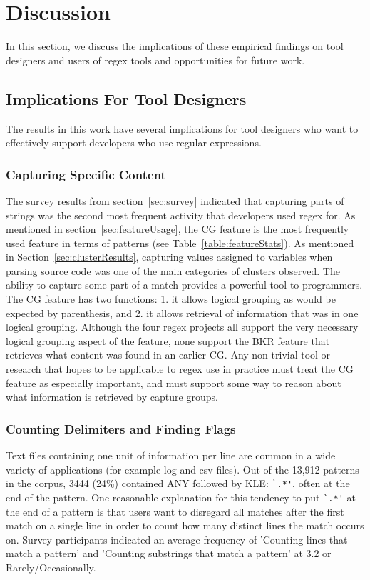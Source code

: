 \section{Discussion}
\label{sec:discussion}

In this section, we discuss the implications of these empirical findings on tool designers and users of regex tools and opportunities for future work.

\subsection{Implications For Tool Designers}
The results in this work have several implications for tool designers who want to effectively support developers who use regular expressions. 

\subsubsection{Capturing Specific Content}
The survey results from section~\ref{sec:survey} indicated that capturing parts of strings was the second most frequent activity that developers used regex for.  As mentioned in section~\ref{sec:featureUsage}, the CG feature is the most frequently used feature in terms of patterns (see Table~\ref{table:featureStats}).  As mentioned in Section~\ref{sec:clusterResults}, capturing values assigned to variables when parsing source code was one of the main categories of clusters observed.  The ability to capture some part of a match provides a powerful tool to programmers.  The CG feature has two functions: 1. it allows logical grouping as would be expected by parenthesis, and 2. it allows retrieval of information that was in one logical grouping.  Although the four regex projects all support the very necessary logical grouping aspect of the feature, none support the BKR feature that retrieves what content was found in an earlier CG.  Any non-trivial tool or research that hopes to be applicable to regex use in practice must treat the CG feature as especially important, and must support some way to reason about what information is retrieved by capture groups.

\subsubsection{Counting Delimiters and Finding Flags}
Text files containing one unit of information per line are common in a wide variety of applications (for example log and csv files).  Out of the 13,912 patterns in the corpus, 3444 (24\%) contained ANY followed by KLE: \verb!`.*'!, often at the end of the pattern.
One reasonable explanation for this tendency to put \verb!`.*'! at the end of a pattern is that users want to disregard all matches after the first match on a single line in order to count how many distinct lines the match occurs on.  Survey participants indicated an average frequency of 'Counting lines that match a pattern' and 'Counting substrings that match a pattern' at 3.2 or Rarely/Occasionally.

